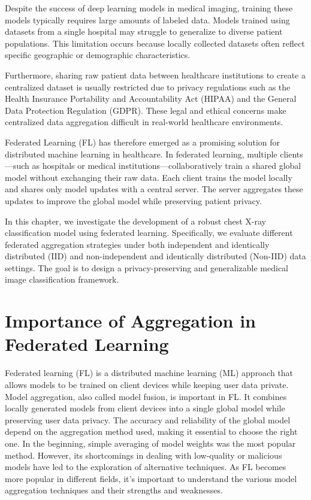 \documentclass[12pt]{book}
\begin{document}
Despite the success of deep learning models in medical imaging, training these models typically requires large amounts of labeled data. Models trained using datasets from a single hospital may struggle to generalize to diverse patient populations. This limitation occurs because locally collected datasets often reflect specific geographic or demographic characteristics.

Furthermore, sharing raw patient data between healthcare institutions to create a centralized dataset is usually restricted due to privacy regulations such as the Health Insurance Portability and Accountability Act (HIPAA) and the General Data Protection Regulation (GDPR). These legal and ethical concerns make centralized data aggregation difficult in real-world healthcare environments.

Federated Learning (FL) has therefore emerged as a promising solution for distributed machine learning in healthcare. In federated learning, multiple clients—such as hospitals or medical institutions—collaboratively train a shared global model without exchanging their raw data. Each client trains the model locally and shares only model updates with a central server. The server aggregates these updates to improve the global model while preserving patient privacy.

In this chapter, we investigate the development of a robust chest X-ray classification model using federated learning. Specifically, we evaluate different federated aggregation strategies under both independent and identically distributed (IID) and non-independent and identically distributed (Non-IID) data settings. The goal is to design a privacy-preserving and generalizable medical image classification framework.

\section{Importance of Aggregation in Federated Learning}

Federated learning (FL) is a distributed machine learning (ML) approach that allows models to be trained on client devices while keeping user data private. Model aggregation, also called model fusion, is important in FL. It combines locally generated models from client devices into a single global model while preserving user data privacy. The accuracy and reliability of the global model depend on the aggregation method used, making it essential to choose the right one. In the beginning, simple averaging of model weights was the most popular method. However, its shortcomings in dealing with low-quality or malicious models have led to the exploration of alternative techniques. As FL becomes more popular in different fields, it's important to understand the various model aggregation techniques and their strengths and weaknesses.
\end{document}
